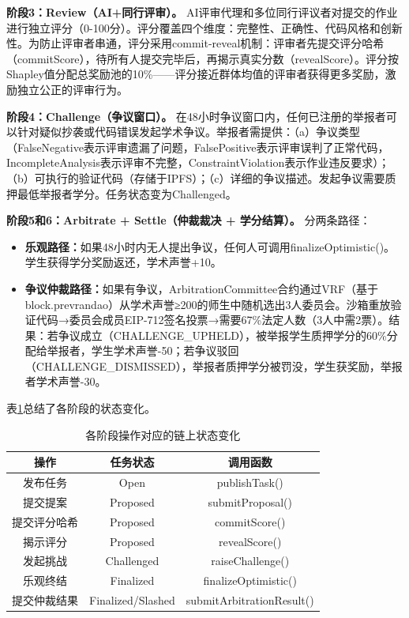 \documentclass[10.5pt,compsoc]{CjC}
\begin{document}
\textbf{阶段3：Review（AI+同行评审）。} AI评审代理和多位同行评议者对提交的作业进行独立评分（0-100分）。评分覆盖四个维度：完整性、正确性、代码风格和创新性。为防止评审者串通，评分采用commit-reveal机制：评审者先提交评分哈希（commitScore），待所有人提交完毕后，再揭示真实分数（revealScore）。评分按Shapley值分配总奖励池的10\%——评分接近群体均值的评审者获得更多奖励，激励独立公正的评审行为。

\textbf{阶段4：Challenge（争议窗口）。} 在48小时争议窗口内，任何已注册的举报者可以针对疑似抄袭或代码错误发起学术争议。举报者需提供：（a）争议类型（FalseNegative表示评审遗漏了问题，FalsePositive表示评审误判了正常代码，IncompleteAnalysis表示评审不完整，ConstraintViolation表示作业违反要求）；（b）可执行的验证代码（存储于IPFS）；（c）详细的争议描述。发起争议需要质押最低举报者学分。任务状态变为Challenged。

\textbf{阶段5和6：Arbitrate + Settle（仲裁裁决 + 学分结算）。} 分两条路径：
\begin{itemize}[nosep]
  \item \textbf{乐观路径：}如果48小时内无人提出争议，任何人可调用finalizeOptimistic()。学生获得学分奖励返还，学术声誉+10。
  \item \textbf{争议仲裁路径：}如果有争议，ArbitrationCommittee合约通过VRF（基于block.prevrandao）从学术声誉≥200的师生中随机选出3人委员会。沙箱重放验证代码→委员会成员EIP-712签名投票→需要67\%法定人数（3人中需2票）。结果：若争议成立（CHALLENGE\_UPHELD），被举报学生质押学分的60\%分配给举报者，学生学术声誉-50；若争议驳回（CHALLENGE\_DISMISSED），举报者质押学分被罚没，学生获奖励，举报者学术声誉-30。
\end{itemize}

表\ref{tab:states}总结了各阶段的状态变化。

\begin{table}[H]
\centering
{}
\renewcommand{\arraystretch}{1.15}
\begin{tabular}{|c|c|c|}
\hline
\textbf{操作} & \textbf{任务状态} & \textbf{调用函数} \\
\hline
发布任务 & Open & publishTask() \\
提交提案 & Proposed & submitProposal() \\
提交评分哈希 & Proposed & commitScore() \\
揭示评分 & Proposed & revealScore() \\
发起挑战 & Challenged & raiseChallenge() \\
乐观终结 & Finalized & finalizeOptimistic() \\
提交仲裁结果 & Finalized/Slashed & submitArbitrationResult() \\
\hline
\end{tabular}
\caption{各阶段操作对应的链上状态变化}
\label{tab:states}
\end{table}
\end{document}
